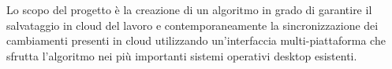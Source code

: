 Lo scopo del progetto è la creazione di un algoritmo in grado di garantire il salvataggio in cloud del lavoro e contemporaneamente la sincronizzazione dei cambiamenti presenti in cloud utilizzando un'interfaccia multi-piattaforma che sfrutta l'algoritmo nei più importanti sistemi operativi desktop esistenti.